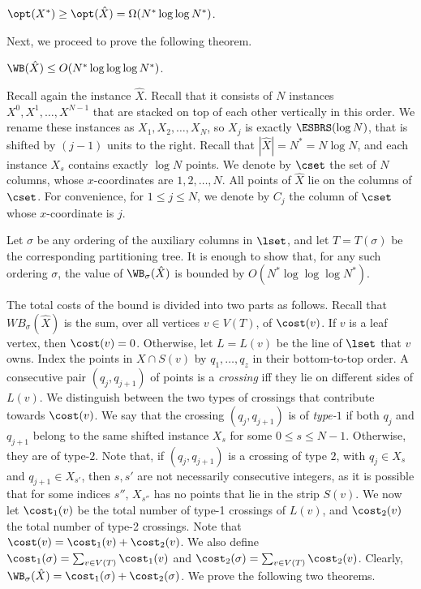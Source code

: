 \documentclass{toc}
\begin{document}
\begin{claim}
	$\opt(X^*)\geq \opt(\hat{X})=\Omega(N^*\log\log N^*)$.
\end{claim}
%
%
%
%
%
%
%
%
%
%
%
%



%

%

Next, we proceed to prove the following theorem. 

\begin{theorem}\label{thm: bound for first final instance}
$\WB(\hat X)\leq O(N^*\log\log\log N^*)$.
\end{theorem}
 
Recall again the instance $\hat X$. Recall that it consists of $N$ instances $X^0,X^1,\ldots,X^{N-1}$ that are stacked on top of each other vertically in this order. 
We rename these instances as $X_1,X_2,\ldots,X_{N}$, so $X_j$ is exactly $\ESBRS(\log N)$, that is shifted by $(j-1)$ units to the right. 
Recall that $|\hat X|=N^*=N\log N$, and each instance $X_s$ contains exactly $\log N$ points.
We denote by $\cset$ the set of $N$ columns, whose $x$-coordinates are $1,2,\ldots,N$. 
All points of $\hat X$ lie on the columns of $\cset$. For convenience, for $1\leq j\leq N$, we denote by $C_j$ the column of $\cset$ whose $x$-coordinate is $j$.



Let $\sigma$ be any ordering of the auxiliary columns in $\lset$, and let $T=T({\sigma})$ be the corresponding partitioning tree.
It is enough to show that, for any such ordering $\sigma$, the value of $\WB_{\sigma}(\hat{X})$ is bounded by $O(N^*\log\log\log N^*)$. %

The total costs of the bound is divided into two parts as follows. 
Recall that $WB_{\sigma}(\hat{X})$ is the sum, over all vertices $v\in V(T)$, of $\cost(v)$. 
If $v$ is a leaf vertex, then $\cost(v)=0$. Otherwise, let $L=L(v)$ be the line of $\lset$ that $v$ owns.
Index the points in $X \cap S(v)$ by $q_1,\ldots, q_z$ in their bottom-to-top order.
A consecutive pair $(q_j, q_{j+1})$ of points is a \emph{crossing} iff they lie on different sides of $L(v)$.  
We distinguish between the two types of crossings that contribute towards $\cost(v)$. 
We say that the crossing $(q_j, q_{j+1})$ is of \emph{type-$1$} if both $q_j$ and $q_{j+1}$ belong to the same shifted instance $X_s$ for some $0\leq s\leq N-1$.
Otherwise, they are of type-$2$. 
Note that, if $(q_j,q_{j+1})$ is a crossing of type $2$, with $q_j\in X_s$ and $q_{j+1}\in X_{s'}$, then $s,s'$ are not necessarily consecutive integers, as it is possible that for some indices $s''$, $X_{s''}$ has no points that lie in the strip $S(v)$.
We now let $\cost_1(v)$ be the total number of type-1 crossings of $L(v)$, and $\cost_2(v)$ the total number of type-2 crossings. Note that $\cost(v)=\cost_1(v)+\cost_2(v)$. 
We also define $\cost_1(\sigma) = \sum_{v \in V(T)} \cost_1(v)$ and $\cost_2(\sigma) = \sum_{v \in V(T)} \cost_2(v)$. 
Clearly, $\WB_{\sigma}(\hat X)=\cost_1(\sigma)+\cost_2(\sigma)$. 
%
We  prove the following two theorems. %
\end{document}
